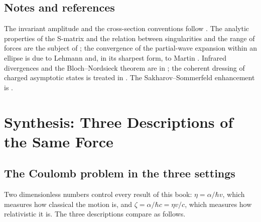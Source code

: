 \documentclass[11pt,a4paper]{book}
\numberwithin{equation}{chapter}
\begin{document}
\section*{Notes and references}
The invariant amplitude and the cross-section conventions follow \cite{Weinberg,PS,Itzykson}. The analytic properties of the S-matrix and the relation between singularities and the range of forces are the subject of \cite{Eden,MartinSpearman}; the convergence of the partial-wave expansion within an ellipse is due to Lehmann \cite{Lehmann58} and, in its sharpest form, to Martin \cite{Martin63}. Infrared divergences and the Bloch--Nordsieck theorem are in \cite{BlochNordsieck,Weinberg}; the coherent dressing of charged asymptotic states is treated in \cite{Chung65,KF70}. The Sakharov--Sommerfeld enhancement is \cite{Sakharov48,Sommerfeld31}.

\chapter{Synthesis: Three Descriptions of the Same Force}

\section{The Coulomb problem in the three settings}

Two dimensionless numbers control every result of this book: $\eta=\alpha/\hbar v$,
which measures how classical the motion is, and $\zeta=\alpha/\hbar c=\eta v/c$,
which measures how relativistic it is. The three descriptions compare as follows.
\end{document}
